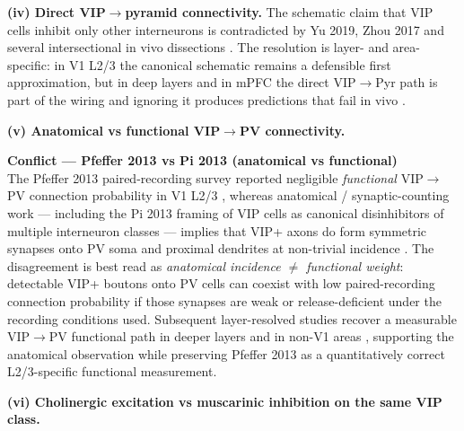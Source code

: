 \documentclass[11pt]{article}
\let\origrightarrow\rightarrow
\def\rightarrow{\ensuremath{\origrightarrow}}
\begin{document}
\textbf{(iv) Direct VIP\rightarrow pyramid connectivity.} The schematic claim that VIP cells inhibit only other interneurons is contradicted by Yu 2019, Zhou 2017 and several intersectional in vivo dissections \citep{Zhou2017, Anastasiades2021a, Walker2016}. The resolution is layer- and area-specific: in V1 L2/3 the canonical schematic remains a defensible first approximation, but in deep layers and in mPFC the direct VIP\rightarrow Pyr path is part of the wiring and ignoring it produces predictions that fail in vivo \citep{Yu2019, Zhou2017, Anastasiades2021a, Walker2016, Pfeffer2013}.

\textbf{(v) Anatomical vs functional VIP\rightarrow PV connectivity.}

\begin{framed}
\textbf{Conflict --- Pfeffer 2013 vs Pi 2013 (anatomical vs functional)}\\
The Pfeffer 2013 paired-recording survey reported negligible \textit{functional} VIP\rightarrow PV connection probability in V1 L2/3 \citep{Pfeffer2013}, whereas anatomical / synaptic-counting work --- including the Pi 2013 framing of VIP cells as canonical disinhibitors of multiple interneuron classes --- implies that VIP+ axons do form symmetric synapses onto PV soma and proximal dendrites at non-trivial incidence \citep{Walker2016, Karnani2016a}. The disagreement is best read as \textit{anatomical incidence $\neq$ functional weight}: detectable VIP+ boutons onto PV cells can coexist with low paired-recording connection probability if those synapses are weak or release-deficient under the recording conditions used. Subsequent layer-resolved studies recover a measurable VIP\rightarrow PV functional path in deeper layers and in non-V1 areas \citep{Yu2019, Anastasiades2021a, Walker2016}, supporting the anatomical observation while preserving Pfeffer 2013 as a quantitatively correct L2/3-specific functional measurement.
\end{framed}

\textbf{(vi) Cholinergic excitation vs muscarinic inhibition on the same VIP class.}
\end{document}
